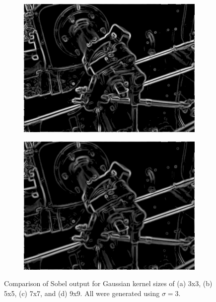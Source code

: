 \documentclass[12pt]{article}
\begin{document}
\begin{figure}[H]
\begin{subfigure}[b]{0.45\linewidth}
				\subcaption{}
				\label{fig:sobelGaussianCmp5x5}
			\end{subfigure} %
			\begin{subfigure}[b]{0.45\linewidth}
				\includegraphics[width=1\linewidth,keepaspectratio]{../examples/valve/valve_gaussian-7x7_thresh-25}
				\subcaption{}
				\label{fig:sobelGaussianCmp7x7}
			\end{subfigure} %
			\begin{subfigure}[b]{0.45\linewidth}
				\includegraphics[width=1\linewidth,keepaspectratio]{../examples/valve/valve_gaussian-9x9_thresh-25}
				\subcaption{}
				\label{fig:sobelGaussianCmp9x9}
			\end{subfigure} %
			\caption{\small Comparison of Sobel output for Gaussian kernel sizes of (a) 3x3, (b) 5x5, (c) 7x7, and (d) 9x9. All were generated using $\sigma = 3$.}
			\label{fig:sobelGaussianCmp}
		\end{figure} %
\end{document}
